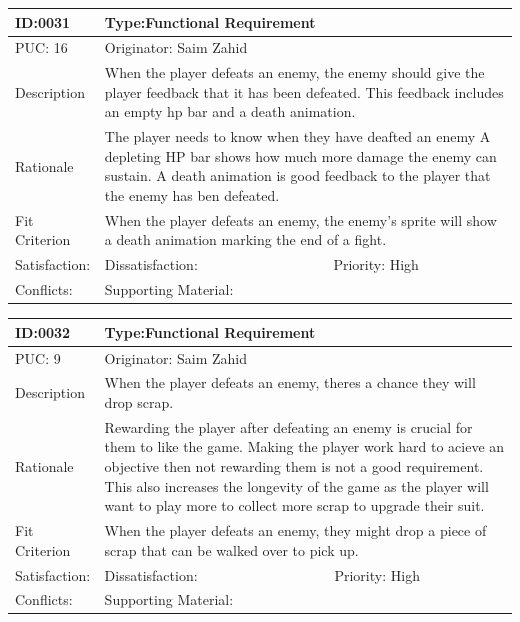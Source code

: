 \documentclass{article}
\begin{document}
	\begin{table}[H]
		\begin{tabular}{|l|l|l|}
			\hline
			ID:0031 & \multicolumn{2}{l|}{Type:Functional Requirement} \\ \hline
			PUC: 16 & \multicolumn{2}{l|}{Originator: Saim Zahid} \\ \hline
			Description & \multicolumn{2}{m{0.85\textwidth}|}{When the player defeats an enemy, the enemy should give the player feedback that it has been defeated. This feedback includes an empty hp bar and a death animation.} \\ \hline
			Rationale & \multicolumn{2}{m{0.85\textwidth}|}{The player needs to know when they have deafted an enemy A depleting HP bar shows how much more damage the enemy can sustain. A death animation is good feedback to the player that the enemy has ben defeated.} \\ \hline
			Fit Criterion & \multicolumn{2}{m{0.85\textwidth}|}{When the player defeats an enemy, the enemy's sprite will show a death animation marking the end of a fight.} \\ \hline
			Satisfaction: & Dissatisfaction: & Priority: High\\ \hline
			Conflicts: & \multicolumn{2}{l|}{Supporting Material:} \\ \hline
		\end{tabular}
	\end{table}

	\begin{table}[H]
		\begin{tabular}{|l|l|l|}
			\hline
			ID:0032 & \multicolumn{2}{l|}{Type:Functional Requirement} \\ \hline
			PUC: 9 & \multicolumn{2}{l|}{Originator: Saim Zahid} \\ \hline
			Description & \multicolumn{2}{m{0.85\textwidth}|}{When the player defeats an enemy, theres a chance they will drop scrap.} \\ \hline
			Rationale & \multicolumn{2}{m{0.85\textwidth}|}{Rewarding the player after defeating an enemy is crucial for them to like the game. Making the player work hard to acieve an objective then not rewarding them is not a good requirement. This also increases the longevity of the game as the player will want to play more to collect more scrap to upgrade their suit.} \\ \hline
			Fit Criterion & \multicolumn{2}{m{0.85\textwidth}|}{When the player defeats an enemy, they might drop a piece of scrap that can be walked over to pick up.} \\ \hline
			Satisfaction: & Dissatisfaction: & Priority: High\\ \hline
			Conflicts: & \multicolumn{2}{l|}{Supporting Material:} \\ \hline
		\end{tabular}
	\end{table}
\end{document}
